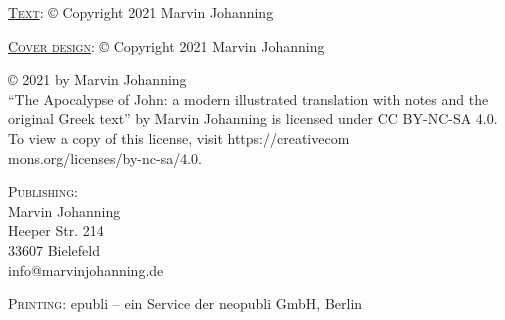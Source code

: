 \thispagestyle{empty}
\noindent\textsc{\underline{Text}}: © Copyright 2021 Marvin Johanning

\noindent\textsc{\underline{Cover design}}: © Copyright 2021 Marvin Johanning

\noindent© 2021 by Marvin Johanning\\``The Apocalypse of John: a modern illustrated translation with notes and the original Greek text'' by Marvin Johanning is licensed under CC BY-NC-SA 4.0. To view a copy of this license, visit https://creativecom\\mons.org/licenses/by-nc-sa/4.0.

\vspace{10mm}\noindent\textsc{Publishing}: \\
Marvin Johanning\\
Heeper Str.  214\\
33607 Bielefeld\\
info@marvinjohanning.de

\vspace{5mm}\noindent\textsc{Printing}: epubli – ein Service der neopubli GmbH, Berlin
\newpage